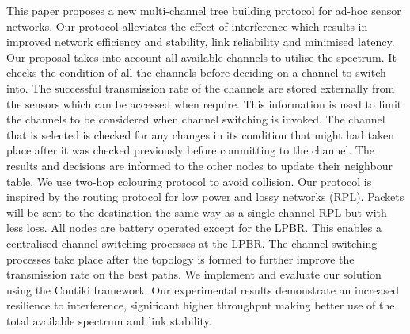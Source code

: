 This paper proposes a new multi-channel tree building protocol for ad-hoc sensor networks. Our protocol alleviates the effect of interference which results in improved network efficiency and stability, link reliability and minimised latency. 
        Our proposal takes into account all available channels to utilise the spectrum. It checks the condition of all the channels before deciding on a channel to switch into. The successful transmission rate of the channels are stored externally from the sensors which can be accessed when require. This information is used to limit the channels to be considered when channel switching is invoked. The channel that is selected is checked for any changes in its condition that might had taken place after it was checked previously before committing to the channel. The results and decisions are informed to the other nodes to update their neighbour table. We use two-hop colouring protocol to avoid collision. 
	Our protocol is inspired by the routing protocol for low power and lossy networks (RPL). Packets will be sent to the destination the same way as a single channel RPL but with less loss. 
	All nodes are battery operated except for the LPBR. This enables a centralised channel switching processes at the LPBR. The channel switching processes take place after the topology is formed to further improve the transmission rate on the best paths.
	We implement and evaluate our solution using the Contiki framework. Our experimental results demonstrate an increased resilience to interference, significant higher throughput making better use of the total available spectrum and link stability. 
